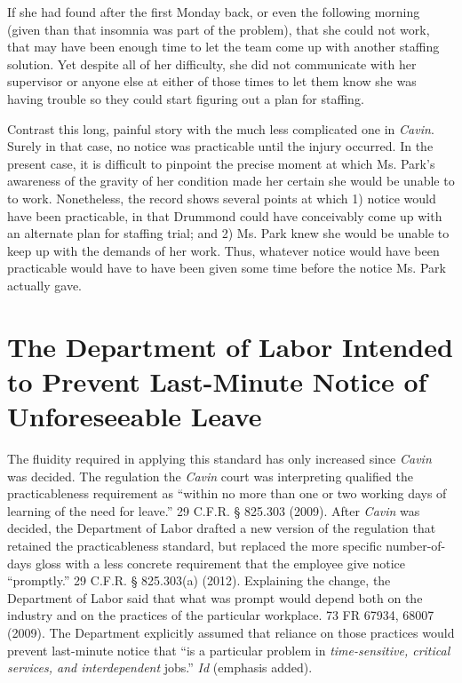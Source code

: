 If she had found after the first Monday back, or even the following morning (given than that insomnia was part of the problem), that she could not work, that may have been enough time to let the team come up with another staffing solution. Yet despite all of her difficulty, she did not communicate with her supervisor or anyone else at either of those times to let them know she was having trouble so they could start figuring out a plan for staffing.

Contrast this long, painful story with the much less complicated one in \emph{Cavin}. Surely in that case, no notice was practicable until the injury occurred. In the present case, it is difficult to pinpoint the precise moment at which Ms. Park's awareness of the gravity of her condition made her certain she would be unable to to work. Nonetheless, the record shows several points at which 1) notice would have been practicable, in that Drummond could have conceivably come up with an alternate plan for staffing trial; and 2) Ms. Park knew she would be unable to keep up with the demands of her work. Thus, whatever notice would have been practicable would have to have been given some time before the notice Ms. Park actually gave.

\section{The Department of Labor Intended to Prevent Last-Minute Notice of Unforeseeable Leave}
\label{thedepartmentoflaborintendedtopreventlast-minutenoticeofunforeseeableleave}

The fluidity required in applying this standard has only increased since \emph{Cavin} was decided. The regulation the \emph{Cavin} court was interpreting qualified the practicableness requirement as ``within no more than one or two working days of learning of the need for leave.'' 29 C.F.R. § 825.303 (2009). After \emph{Cavin} was decided, the Department of Labor drafted a new version of the regulation that retained the practicableness standard, but replaced the more specific number-of-days gloss with a less concrete requirement that the employee give notice ``promptly.'' 29 C.F.R. § 825.303(a) (2012). Explaining the change, the Department of Labor said that what was prompt would depend both on the industry and on the practices of the particular workplace. 73 FR 67934, 68007 (2009). The Department explicitly assumed that reliance on those practices would prevent last-minute notice that ``is a particular problem in \emph{time-sensitive, critical services, and interdependent} jobs.'' \emph{Id} (emphasis added).

